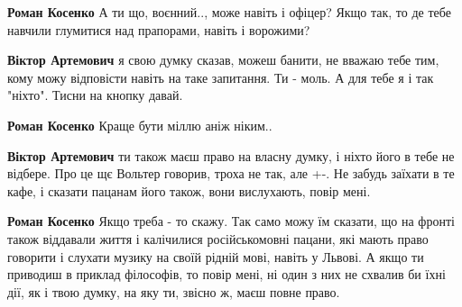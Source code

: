 \begin{itemize}
\begin{itemize}
\begin{itemize}


 
\textbf{Роман Косенко} А ти що, воєнний.., може навіть і офіцер? Якщо так, то де тебе навчили глумитися над прапорами, навіть і ворожими?

 
\textbf{Віктор Артемович} я свою думку сказав, можеш банити, не вважаю тебе тим, кому можу відповісти навіть на таке запитання. Ти - моль. А для тебе я і так "ніхто". Тисни на кнопку давай.

 
\textbf{Роман Косенко} Краще бути міллю аніж ніким..

 
\textbf{Віктор Артемович} ти також маєш право на власну думку, і ніхто його в тебе не відбере. Про це щє Вольтер говорив, троха не так, але +-. Не забудь заїхати в те кафе, і сказати пацанам його також, вони вислухають, повір мені.

 
\textbf{Роман Косенко} Якщо треба - то скажу. Так само можу їм сказати, що на
фронті також віддавали життя і калічилися російськомовні пацани, які мають
право говорити і слухати музику на своїй рідній мові, навіть у Львові. А якщо
ти приводиш в приклад філософів, то повір мені, ні один з них не схвалив би
їхні дії, як і твою думку, на яку ти, звісно ж, маєш повне право.


\end{itemize}
\end{itemize}
\end{itemize}
